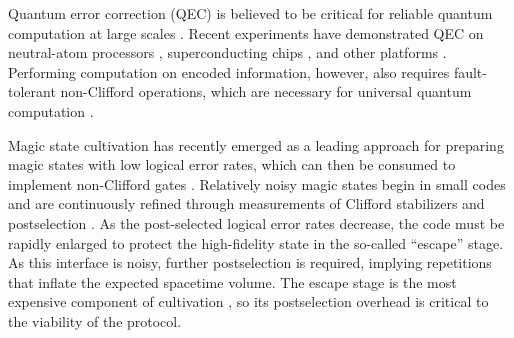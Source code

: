 \documentclass[
    reprint,
    amsmath,amssymb,
    nofootinbib,
    superscriptaddress,
    aps,
    noeprint,
    longbibliography,
    prl
]{revtex4-2}
\theoremstyle{plain}
\begin{document}
Quantum error correction (QEC) is believed to be critical for reliable quantum computation at large
scales \cite{shor_scheme_1995, steane_error_1996, knill_resilient_1998,
aharonov_fault-tolerant_2008, kitaev_fault-tolerant_2003, terhal_quantum_2015, fowler_surface_2012}.
Recent experiments have demonstrated QEC on neutral-atom processors
\cite{bluvstein_logical_2024, bluvstein_fault-tolerant_2026, reichardt_fault-tolerant_2025, computing2026quantumerrorcorrectiontoric},
superconducting chips \cite{acharya_suppressing_2023, acharya_quantum_2025, krinner_realizing_2022},
and other platforms \cite{ryan-anderson_realization_2021, postler_demonstration_2022,
paetznick_demonstration_2024, abobeih_fault-tolerant_2022}.
Performing computation on encoded information, however, also requires fault-tolerant non-Clifford
operations, which are necessary for universal quantum computation \cite{gottesman_heisenberg_1998, knill_fault-tolerant_2004,
bravyi_universal_2005, eastin_restrictions_2009, zeng_transversality_2011}. 

Magic state cultivation \cite{chamberland_very_2020, itogawa_efficient_2025, gidney_magic_2024,
rosenfeld_magic_2025, sahay2026fold, vaknin_high_2026, claes_cultivating_2025, chen_efficient_2025,
hirano2026efficient} has recently emerged as a leading approach for preparing magic states with low
logical error rates, which can then be consumed to implement non-Clifford gates
\cite{gottesman_demonstrating_1999, zhou_methodology_2000, knill_fault-tolerant_2004,bravyi_universal_2005,
litinski_magic_2019}. Relatively noisy magic states begin in small codes \cite{li_magic_2015, gidney_cleaner_2023} and are continuously
refined through measurements of Clifford stabilizers and postselection \cite{chamberland_fault-tolerant_2019, chamberland_very_2020, itogawa_efficient_2025}. As the post-selected logical
error rates decrease, the code must be rapidly enlarged to protect the high-fidelity state in the
so-called ``escape'' stage. As this interface is noisy, further postselection is required,
implying repetitions that inflate the expected spacetime volume. The escape stage is the most
expensive component of cultivation \cite{sahay2026fold}, so its postselection overhead is critical
to the viability of the protocol.
\end{document}
